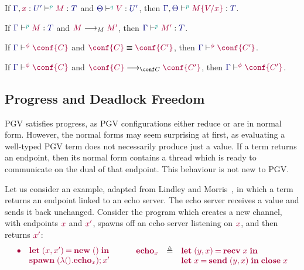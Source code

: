 \begin{lem}\label{lem:pgv-substitution}
  If $\tseq[\cs{p}]{\ty{\Gamma},\tmty{x}{U'}}{M}{T}$ and $\tseq[\cs{q}]{\ty{\Theta}}{V}{U'}$, then $\tseq[\cs{p}]{\ty{\Gamma},\ty{\Theta}}{\subst{M}{V}{x}}{T}$.
\end{lem}


\begin{lem}\label{lem:pgv-subject-reduction-terms}
  If $\tseq[\cs{p}]{\ty{\Gamma}}{M}{T}$ and $\tm{M}\tred\tm{M'}$,
  then $\tseq[\cs{p}]{\ty{\Gamma}}{M'}{T}$.
\end{lem}


\begin{lem}\label{lem:pgv-subject-congruence}
  If $\cseq[\phi]{\ty{\Gamma}}{\conf{C}}$ and $\tm{\conf{C}}\equiv\tm{\conf{C'}}$,
  then $\cseq[\phi]{\ty{\Gamma}}{\conf{C'}}$.
\end{lem}


\begin{thm}\label{thm:pgv-subject-reduction-confs}
  If $\cseq[\phi]{\ty{\Gamma}}{\conf{C}}$ and $\tm{\conf{C}}\cred\tm{\conf{C'}}$,
  then $\cseq[\phi]{\ty{\Gamma}}{\conf{C'}}$.
\end{thm}


\subsection{Progress and Deadlock Freedom}
PGV satisfies progress, as PGV configurations either reduce or are in normal form. However, the normal forms may seem surprising at first, as evaluating a well-typed PGV term does not necessarily produce {just} a value. If a term returns an endpoint, then its normal form contains a thread which is ready to communicate on the dual of that endpoint. This behaviour is not new to PGV.

Let us consider an example, adapted from Lindley and Morris~\cite{lindleymorris15}, in which a term returns an endpoint linked to an echo server. The echo server receives a value and sends it back unchanged. Consider the program which creates a new channel, with endpoints $\tm{x}$ and $\tm{x'}$, spawns off an echo server listening on $\tm{x}$, and then returns $\tm{x'}$:
\[
  \begin{array}{ll}
    \tm{\main}
     & \tm{\letpair{x}{x'}{\new\;\unit}{}}
    \\
     & \tm{\andthen{\spawn\;(\lambda\unit.\echo_{x})}{x'}}
  \end{array}
  \hfill\qquad\hfill
  \begin{array}{lcl}
    \tm{\echo_x}
     & \defeq
     & \tm{\letpair{y}{x}{\recv\;{x}}{}}
    \\
     &
     & \tm{\letbind{x}{\send\;\pair{y}{x}}{\close\;x}}
  \end{array}
\]

